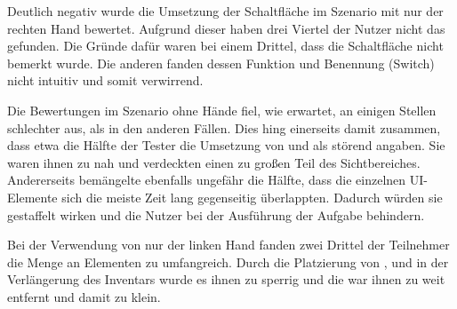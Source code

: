 		Deutlich negativ wurde die Umsetzung der Schaltfläche im Szenario mit nur der rechten Hand bewertet. Aufgrund dieser haben drei Viertel der Nutzer nicht das  gefunden. Die Gründe dafür waren bei einem Drittel, dass die Schaltfläche nicht bemerkt wurde. Die anderen fanden dessen Funktion und Benennung (Switch) nicht intuitiv und somit verwirrend.
		
		
		Die Bewertungen im Szenario ohne Hände fiel, wie erwartet, an einigen Stellen schlechter aus, als in den anderen Fällen. Dies hing einerseits damit zusammen, dass etwa die Hälfte der Tester die Umsetzung von  und  als störend angaben. Sie waren ihnen zu nah und verdeckten einen zu großen Teil des Sichtbereiches. Andererseits bemängelte ebenfalls ungefähr die Hälfte, dass die einzelnen UI-Elemente sich die meiste Zeit lang gegenseitig überlappten. Dadurch würden sie gestaffelt wirken und die Nutzer bei der Ausführung der Aufgabe behindern.
		
		
		Bei der Verwendung von nur der linken Hand fanden zwei Drittel der Teilnehmer die Menge an Elementen zu umfangreich. Durch die Platzierung von ,  und  in der Verlängerung des Inventars wurde es ihnen zu sperrig und die  war ihnen zu weit entfernt und damit zu klein.
		